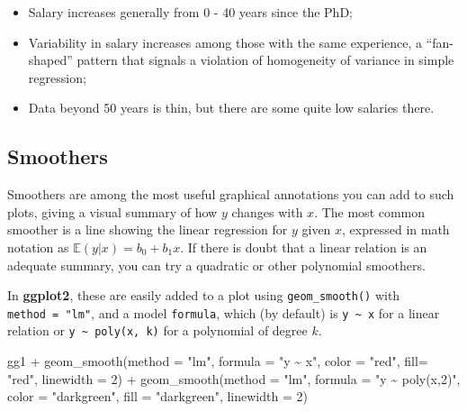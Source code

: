 \documentclass[
  letterpaper,
  10pt,
  krantz2]{krantz}
\makeatletter
\newenvironment{Shaded}{\begin{snugshade}}{\end{snugshade}}
\newcommand{\AttributeTok}[1]{\textcolor[rgb]{0.40,0.45,0.13}{#1}}
\newcommand{\DecValTok}[1]{\textcolor[rgb]{0.68,0.00,0.00}{#1}}
\newcommand{\FunctionTok}[1]{\textcolor[rgb]{0.28,0.35,0.67}{#1}}
\newcommand{\NormalTok}[1]{\textcolor[rgb]{0.00,0.23,0.31}{#1}}
\newcommand{\SpecialCharTok}[1]{\textcolor[rgb]{0.37,0.37,0.37}{#1}}
\newcommand{\StringTok}[1]{\textcolor[rgb]{0.13,0.47,0.30}{#1}}
\providecommand{\tightlist}{%
  \setlength{\itemsep}{0pt}\setlength{\parskip}{0pt}}\usepackage{longtable,booktabs,array}
\newenvironment{kframe}{%
  \medskip{}
  \setlength{\fboxsep}{.8em}
  \def\at@end@of@kframe{}%
  \ifinner\ifhmode%
  \def\at@end@of@kframe{\end{minipage}}%
  \begin{minipage}{\columnwidth}%
  \fi\fi%
  \def\FrameCommand##1{\hskip\@totalleftmargin \hskip-\fboxsep
  \colorbox{shadecolor}{##1}\hskip-\fboxsep
      \hskip-\linewidth \hskip-\@totalleftmargin \hskip\columnwidth}%
  \MakeFramed {\advance\hsize-\width
    \@totalleftmargin\z@ \linewidth\hsize
    \@setminipage}}%
{\par\unskip\endMakeFramed%
  \at@end@of@kframe}
\renewenvironment{Shaded}{\begin{kframe}}{\end{kframe}}
\makeatother
\begin{document}
\begin{itemize}
\tightlist
\item
  Salary increases generally from 0 - 40 years since the PhD;
\item
  Variability in salary increases among those with the same experience,
  a ``fan-shaped'' pattern that signals a violation of homogeneity of
  variance in simple regression;
\item
  Data beyond 50 years is thin, but there are some quite low salaries
  there.
\end{itemize}

\subsection{Smoothers}\label{smoothers}

Smoothers are among the most useful graphical annotations you can add to
such plots, giving a visual summary of how \(y\) changes with \(x\). The
most common smoother is a line showing the linear regression for \(y\)
given \(x\), expressed in math notation as
\(\mathbb{E} (y | x) = b_0 + b_1 x\). If there is doubt that a linear
relation is an adequate summary, you can try a quadratic or other
polynomial smoothers.

In \textbf{ggplot2}, these are easily added to a plot using
\texttt{geom\_smooth()} with \texttt{method\ =\ "lm"}, and a model
\texttt{formula}, which (by default) is \texttt{y\ \textasciitilde{}\ x}
for a linear relation or \texttt{y\ \textasciitilde{}\ poly(x,\ k)} for
a polynomial of degree \(k\).

\begin{Shaded}
\begin{Highlighting}[]
\NormalTok{gg1 }\SpecialCharTok{+} 
  \FunctionTok{geom\_smooth}\NormalTok{(}\AttributeTok{method =} \StringTok{"lm"}\NormalTok{, }\AttributeTok{formula =} \StringTok{"y \textasciitilde{} x"}\NormalTok{, }
              \AttributeTok{color =} \StringTok{"red"}\NormalTok{, }\AttributeTok{fill=} \StringTok{"red"}\NormalTok{,}
              \AttributeTok{linewidth =} \DecValTok{2}\NormalTok{) }\SpecialCharTok{+}
  \FunctionTok{geom\_smooth}\NormalTok{(}\AttributeTok{method =} \StringTok{"lm"}\NormalTok{, }\AttributeTok{formula =} \StringTok{"y \textasciitilde{} poly(x,2)"}\NormalTok{, }
              \AttributeTok{color =} \StringTok{"darkgreen"}\NormalTok{, }\AttributeTok{fill =} \StringTok{"darkgreen"}\NormalTok{,}
              \AttributeTok{linewidth =} \DecValTok{2}\NormalTok{) }
\end{Highlighting}
\end{Shaded}
\end{document}
